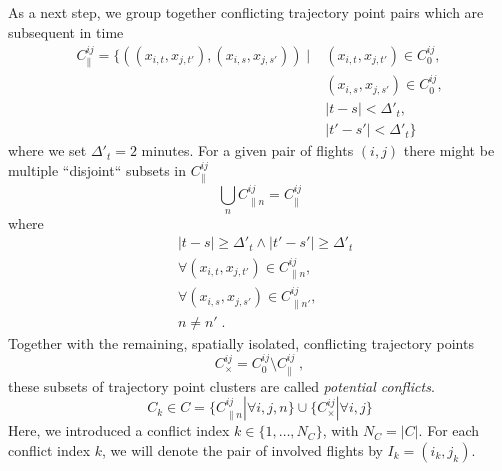 \documentclass[aps,pra,twocolumn,10pt]{revtex4-1}
\begin{document}
As a next step, we group together conflicting trajectory point pairs which are subsequent in time
\begin{align*}
    C^{ij}_\parallel = \{ ((x_{i, t},  x_{j, t'}),  (x_{i, s},  x_{j, s'})) \; | \; & (x_{i, t},  x_{j, t'}) \in C^{ij}_0, \\
                                                                                    & (x_{i, s},  x_{j, s'}) \in C^{ij}_0, \\ 
                                                                                    & |t - s| < \Delta'_t,  \\
                                                                                    & |t' - s'| < \Delta'_t \}
\end{align*}
where we set $\Delta'_t = 2$ minutes.
For a given pair of flights $(i, j)$ there might be multiple ``disjoint`` subsets in $C^{ij}_\parallel$
\begin{equation*}
    \bigcup_{n} C^{ij}_{\parallel n} = C^{ij}_\parallel
\end{equation*}
where
\begin{align*}
    & |t - s| \geq \Delta'_t \land |t' - s'| \geq \Delta'_t \\
    & \forall (x_{i, t},  x_{j, t'}) \in C^{ij}_{\parallel n}, \\
    & \forall (x_{i, s},  x_{j, s'}) \in C^{ij}_{\parallel n'}, \\
    & n \neq n' \; .
\end{align*}
Together with the remaining, spatially isolated, conflicting trajectory points
\begin{equation*}
    C^{ij}_{\times} = C^{ij}_0 \setminus C^{ij}_\parallel \; ,
\end{equation*}
these subsets of trajectory point clusters are called \emph{potential conflicts}.
\begin{equation*}
    C_k \in C = \{ C^{ij}_{\parallel n} | \forall i, j, n\} \cup  \{C^{ij}_{\times} | \forall i, j\}
\end{equation*}
Here, we introduced a conflict index $k\in\{1, \dots, N_C\}$, with $N_C = |C|$.
For each conflict index $k$, we will denote the pair of involved flights by $I_k = (i_k, j_k)$.


\end{document}
